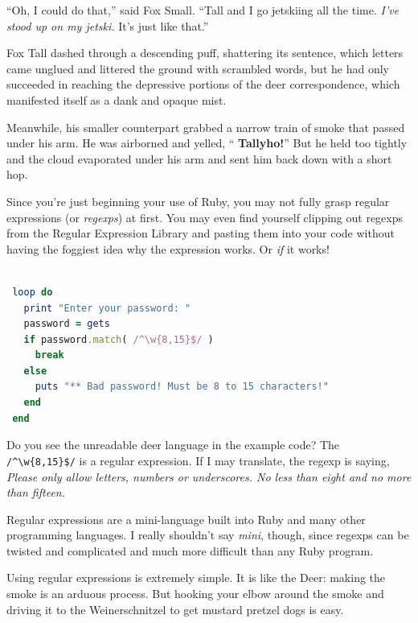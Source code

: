\documentclass[10pt,twoside]{report}
\begin{document}
``Oh, I could do that,'' said Fox Small.  ``Tall and I go jetskiing
all the time.  {\em I've stood up on my jetski.}  It's just like
that.''

Fox Tall dashed through a descending puff, shattering its sentence,
which letters came unglued and littered the ground with scrambled
words, but he had only succeeded in reaching the depressive portions
of the deer correspondence, which manifested itself as a dank and
opaque mist.

Meanwhile, his smaller counterpart grabbed a narrow train of smoke
that passed under his arm.  He was airborned and yelled, ``{\bf
  Tallyho!}''  But he held too tightly and the cloud evaporated under
his arm and sent him back down with a short hop.

Since you're just beginning your use of Ruby, you may not fully grasp
regular expressions (or {\em regexps}) at first.  You may even find
yourself clipping out regexps from the Regular Expression Library and
pasting them into your code without having the foggiest idea why the
expression works.  Or {\em if} it works!


\begin{lstlisting}[basicstyle=\ttfamily\color{basiccolor},
    commentstyle = \ttfamily\color{commentcolor},
    keywordstyle=\ttfamily\color{keywordscolor},
    stringstyle=\color{stringcolor},
    language=Ruby,
    basicstyle=\small\ttfamily,
    showstringspaces=false,
  ]

 loop do
   print "Enter your password: "
   password = gets
   if password.match( /^\w{8,15}$/ )
     break
   else
     puts "** Bad password! Must be 8 to 15 characters!"
   end
 end

\end{lstlisting}


Do you see the unreadable deer language in the example code?  The
\lstinline[breaklines=true]|/^\w{8,15}$/| is a regular expression.  If
I may translate, the regexp is saying, {\em Please only allow letters,
  numbers or underscores.  No less than eight and no more than
  fifteen.}

Regular expressions are a mini-language built into Ruby and many other
programming languages. I really shouldn't say {\em mini}, though,
since regexps can be twisted and complicated and much more difficult
than any Ruby program.

Using regular expressions is extremely simple.  It is like the Deer:
making the smoke is an arduous process.  But hooking your elbow around
the smoke and driving it to the Weinerschnitzel to get mustard pretzel
dogs is easy.
\end{document}
